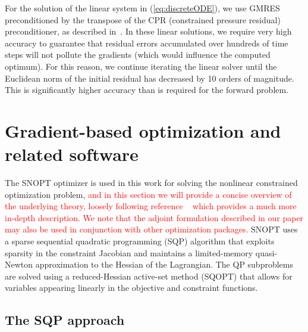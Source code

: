 \documentclass[twocolumn,numbook]{svjour3}          %
\newcommand{\red}[1]{\textcolor{red}{#1}}
\def\u{{\vec u}}
\def\c{{\vec c}}
\def\x{{\vec x}}
\def\s{{\vec s}}
\def\g{{\vec{G}}}
\def\blambda{{\pmb{\lambda}}}%
\def\nthinsp{\mskip -2   mu}
\def\blambdahat{\skew1\widehat \blambda}
\def\blambdastar{\blambda\superstar}
\def\shat{\widehat \s}
\def\sstar{\s\superstar}
\def\superstar{^{\raise 0.5pt\hbox{$\nthinsp *$}}}
\def\xstar{\x\superstar}
\def\uhat{\skew{2.8}\widehat \u}
\def\ustar{\u\superstar}
\def\GQPk{GQP$_k$}
\def\SNOPT {{\small SNOPT}}
\def\SQOPT {{\small SQOPT}}
\begin{document}
For the solution of the linear system in (\ref{eq:discreteODE}), we use
GMRES preconditioned by the transpose of the CPR (constrained
pressure residual) preconditioner, as described in~\cite{CPRA}. In these
linear solutions, we require very high accuracy to guarantee that residual
errors accumulated over hundreds of time steps will not pollute the gradients
(which would influence the computed optimum). For this reason, we continue
iterating the linear solver until the Euclidean norm of the initial residual has
decreased by 10 orders of magnitude. This is significantly higher accuracy than
is required for the forward problem.




\section{Gradient-based optimization and related software}
\label{sec:SQPSNOPT}

The \SNOPT{} optimizer is used in this work for solving the nonlinear constrained
optimization problem, \red{and in this section we will provide a concise overview of the underlying theory, loosely following reference ~\cite{SNOPT} which provides a much more in-depth description. We note that the adjoint formulation described in our paper may also be used in conjunction with other optimization packages.} \SNOPT{} uses a sparse sequential quadratic
programming (SQP) algorithm that exploits sparsity in
the constraint Jacobian and maintains a limited-memory quasi-Newton
approximation to the Hessian of the Lagrangian. The QP
subproblems are solved using a reduced-Hessian
active-set method (\SQOPT) that allows for variables appearing
linearly in the objective and constraint functions. 
 
\subsection{The SQP approach}

%
\end{document}
